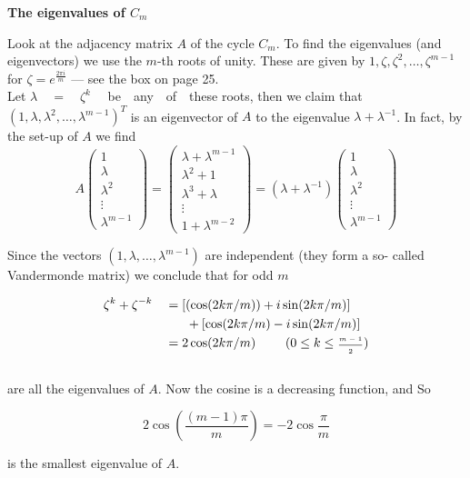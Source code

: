 \begin{mdframed}[nobreak=true,backgroundcolor=gray!15]
\vspace{8pt}
{\Large\textbf{The eigenvalues of $C_m$}}
\vspace{5pt}

Look at the adjacency matrix $A$ of the cycle $C_m$. To find the eigenvalues 
(and eigenvectors) we use the $m$-th roots of unity. These are 
given by $1, \zeta, \zeta^2, \ldots, \zeta^{m-1}$ for $\zeta = e^{\frac{2\pi i}{m}}$ --- see the box on page 25.\\ 
Let $\lambda \quad=\quad\zeta ^k$ \ \ be\ \  any\ \  of\ \  these roots, then we claim that
$(1, \lambda, \lambda^2, \ldots, \lambda^{m-1})^T$ is an eigenvector of $A$ to the eigenvalue $\lambda + \lambda^{-1}$.
In fact, by the set-up of $A$ we find\\

\[
A \begin{pmatrix} 1 \\ \lambda \\ \lambda^2 \\ \vdots \\ \lambda^{m-1} \end{pmatrix}=
\begin{pmatrix} \lambda + \lambda^{m-1} \\ \lambda^2 + 1 \\ \lambda^3 + \lambda \\ \vdots \\ 1+\lambda^{m-2} \end{pmatrix} =
(\lambda + \lambda^{-1}) \begin{pmatrix} 1 \\ \lambda \\ \lambda^2 \\ \vdots \\ \lambda^{m-1} \end{pmatrix} 
\]

Since the vectors $(1, \lambda, \ldots, \lambda^{m-1})$ are independent (they form a so-
called Vandermonde matrix) we conclude that for odd $m$

\begin{equation*}
\begin{aligned}
    \zeta^k + \zeta^{-k}&\quad = [(\cos(2k\pi / m)) + i\sin(2k\pi / m)]\\
&\quad\quad\ \  + [\cos(2k\pi/m) - i\sin(2k\pi / m)]\\
&\quad =  2\cos(2k\pi / m) \quad\quad\  (0 \leq k \leq \text{\tiny{$\frac{m-1}{2}$}})
\end{aligned}
\end{equation*}\\

are all the eigenvalues of $A$. Now the cosine is a decreasing function,
and So

\[
    2\cos({\frac{(m-1)\pi}{m}}) = -2\cos{\frac{\pi}{m}}
\]

is the smallest eigenvalue of $A$. 

\vspace{8pt}
\end{mdframed}



\setnewpagemargins


